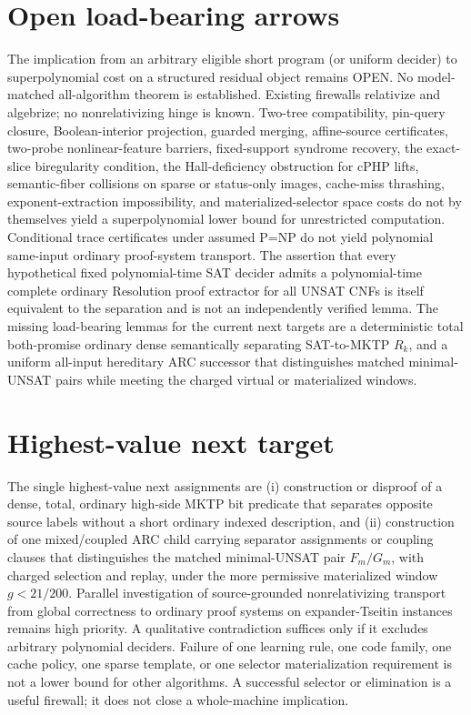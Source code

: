 \documentclass[11pt]{article}
\begin{document}
\section{Open load-bearing arrows}
The implication from an arbitrary eligible short program (or uniform decider) to superpolynomial cost on a structured residual object remains OPEN. No model-matched all-algorithm theorem is established. Existing firewalls relativize and algebrize; no nonrelativizing hinge is known. Two-tree compatibility, pin-query closure, Boolean-interior projection, guarded merging, affine-source certificates, two-probe nonlinear-feature barriers, fixed-support syndrome recovery, the exact-slice biregularity condition, the Hall-deficiency obstruction for cPHP lifts, semantic-fiber collisions on sparse or status-only images, cache-miss thrashing, exponent-extraction impossibility, and materialized-selector space costs do not by themselves yield a superpolynomial lower bound for unrestricted computation. Conditional trace certificates under assumed P=NP do not yield polynomial same-input ordinary proof-system transport. The assertion that every hypothetical fixed polynomial-time SAT decider admits a polynomial-time complete ordinary Resolution proof extractor for all UNSAT CNFs is itself equivalent to the separation and is not an independently verified lemma. The missing load-bearing lemmas for the current next targets are a deterministic total both-promise ordinary dense semantically separating SAT-to-MKTP \(R_k\), and a uniform all-input hereditary ARC successor that distinguishes matched minimal-UNSAT pairs while meeting the charged virtual or materialized windows.

\section{Highest-value next target}
The single highest-value next assignments are (i) construction or disproof of a dense, total, ordinary high-side MKTP bit predicate that separates opposite source labels without a short ordinary indexed description, and (ii) construction of one mixed/coupled ARC child carrying separator assignments or coupling clauses that distinguishes the matched minimal-UNSAT pair \(F_m/G_m\), with charged selection and replay, under the more permissive materialized window \(g<21/200\). Parallel investigation of source-grounded nonrelativizing transport from global correctness to ordinary proof systems on expander-Tseitin instances remains high priority. A qualitative contradiction suffices only if it excludes arbitrary polynomial deciders. Failure of one learning rule, one code family, one cache policy, one sparse template, or one selector materialization requirement is not a lower bound for other algorithms. A successful selector or elimination is a useful firewall; it does not close a whole-machine implication.
\end{document}

